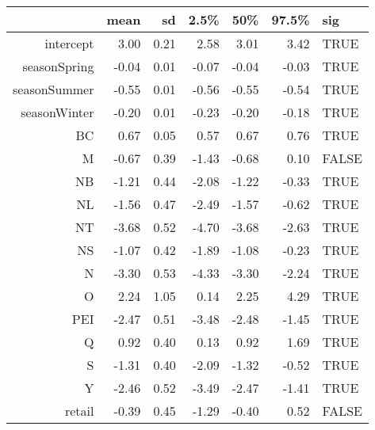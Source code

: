 \begin{table}[ht]
\centering
\begin{tabular}{rrrrrrl}
  \hline
 & mean & sd & 2.5\% & 50\% & 97.5\% & sig \\ 
  \hline
intercept & 3.00 & 0.21 & 2.58 & 3.01 & 3.42 & TRUE \\ 
  seasonSpring & -0.04 & 0.01 & -0.07 & -0.04 & -0.03 & TRUE \\ 
  seasonSummer & -0.55 & 0.01 & -0.56 & -0.55 & -0.54 & TRUE \\ 
  seasonWinter & -0.20 & 0.01 & -0.23 & -0.20 & -0.18 & TRUE \\ 
  BC & 0.67 & 0.05 & 0.57 & 0.67 & 0.76 & TRUE \\ 
  M & -0.67 & 0.39 & -1.43 & -0.68 & 0.10 & FALSE \\ 
  NB & -1.21 & 0.44 & -2.08 & -1.22 & -0.33 & TRUE \\ 
  NL & -1.56 & 0.47 & -2.49 & -1.57 & -0.62 & TRUE \\ 
  NT & -3.68 & 0.52 & -4.70 & -3.68 & -2.63 & TRUE \\ 
  NS & -1.07 & 0.42 & -1.89 & -1.08 & -0.23 & TRUE \\ 
  N & -3.30 & 0.53 & -4.33 & -3.30 & -2.24 & TRUE \\ 
  O & 2.24 & 1.05 & 0.14 & 2.25 & 4.29 & TRUE \\ 
  PEI & -2.47 & 0.51 & -3.48 & -2.48 & -1.45 & TRUE \\ 
  Q & 0.92 & 0.40 & 0.13 & 0.92 & 1.69 & TRUE \\ 
  S & -1.31 & 0.40 & -2.09 & -1.32 & -0.52 & TRUE \\ 
  Y & -2.46 & 0.52 & -3.49 & -2.47 & -1.41 & TRUE \\ 
  retail & -0.39 & 0.45 & -1.29 & -0.40 & 0.52 & FALSE \\ 
   \hline
\end{tabular}
\end{table}
